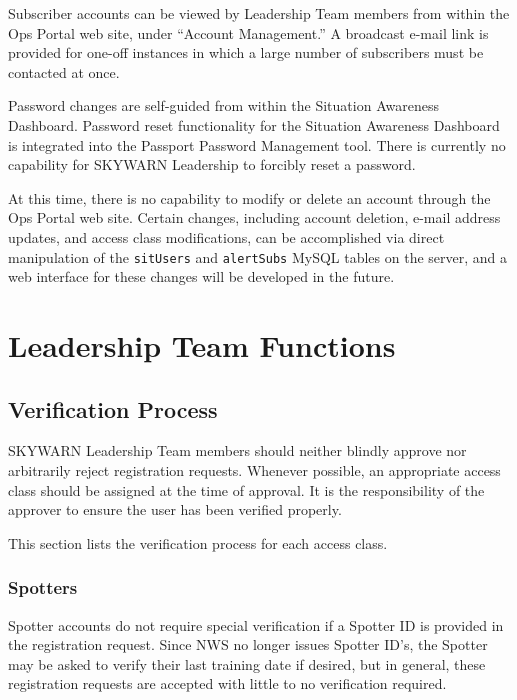 \documentclass[pdflatex,letterpaper,twoside,12pt]{book}
\begin{document}
Subscriber accounts can be viewed by Leadership Team members from within the Ops Portal web site, under ``Account Management.''  A broadcast e-mail link is provided for one-off instances in which a large number of subscribers must be contacted at once.

Password changes are self-guided from within the Situation Awareness Dashboard.  Password reset functionality for the Situation Awareness Dashboard is integrated into the Passport Password Management tool.  There is currently no capability for SKYWARN Leadership to forcibly reset a password.

At this time, there is no capability to modify or delete an account through the Ops Portal web site.  Certain changes, including account deletion, e-mail address updates, and access class modifications, can be accomplished via direct manipulation of the \verb|sitUsers| and \verb|alertSubs| MySQL tables on the server, and a web interface for these changes will be developed in the future.


\section{Leadership Team Functions}\label{sit-leadership-functions}

\subsection{Verification Process}

SKYWARN Leadership Team members should neither blindly approve nor arbitrarily reject registration requests.  Whenever possible, an appropriate access class should be assigned at the time of approval.  It is the responsibility of the approver to ensure the user has been verified properly.

This section lists the verification process for each access class.

\subsubsection{Spotters}

Spotter accounts do not require special verification if a Spotter ID is provided in the registration request.  Since NWS no longer issues Spotter ID's, the Spotter may be asked to verify their last training date if desired, but in general, these registration requests are accepted with little to no verification required.
\end{document}
